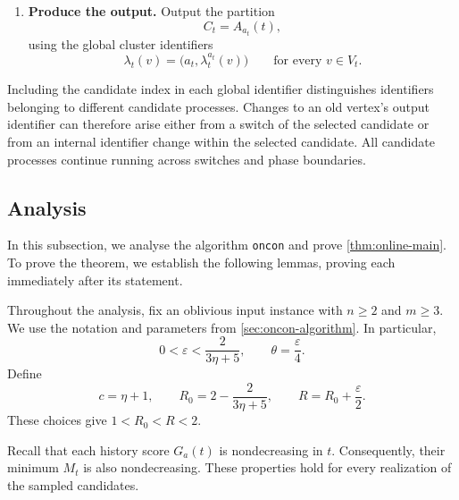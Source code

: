 \documentclass[11pt]{article}
\theoremstyle{definition}
\theoremstyle{remark}
\newcommand{\1}{\mathbf{1}}
\begin{document}
\begin{enumerate}
\begin{enumerate}
\begin{enumerate}
            \item Otherwise, if $G_{a_{t-1}}(t)<T$, retain the
            previous candidate by setting $a_t=a_{t-1}$.

            \item Otherwise, switch to a candidate $a_t$ satisfying
            \[
                G_{a_t}(t)<T.
            \]
            Such a candidate exists because this case is reached
            only when $M_t<T$.
        \end{enumerate}

        \item \textbf{Produce the output.}
        Output the partition
        \[
            C_t=A_{a_t}(t),
        \]
        using the global cluster identifiers
        \[
            \lambda_t(v)=\bigl(a_t,\lambda_t^{a_t}(v)\bigr)
            \qquad\text{for every }v\in V_t.
        \]
    \end{enumerate}
\end{enumerate}

Including the candidate index in each global identifier distinguishes
identifiers belonging to different candidate processes. Changes to an
old vertex's output identifier can therefore arise either from a
switch of the selected candidate or from an internal identifier change
within the selected candidate. All candidate processes continue
running across switches and phase boundaries.

\subsection{Analysis}
\label{subsec:oncon-analysis}

In this subsection, we analyse the algorithm \texttt{oncon} and prove
\cref{thm:online-main}. To prove the theorem, we establish the following
lemmas, proving each immediately after its statement.

Throughout the analysis, fix an oblivious input instance with
$n\geq 2$ and $m\geq 3$. We use the notation and parameters from
\cref{sec:oncon-algorithm}. In particular,
\[
    0<\varepsilon<\frac{2}{3\eta+5},
    \qquad
    \theta=\frac{\varepsilon}{4}.
\]
Define
\[
    c=\eta+1,
    \qquad
    R_0=2-\frac{2}{3\eta+5},
    \qquad
    R=R_0+\frac{\varepsilon}{2}.
\]
These choices give $1<R_0<R<2$.

Recall that each history score $G_a(t)$ is nondecreasing in $t$.
Consequently, their minimum $M_t$ is also nondecreasing. These
properties hold for every realization of the sampled candidates.
\end{document}
